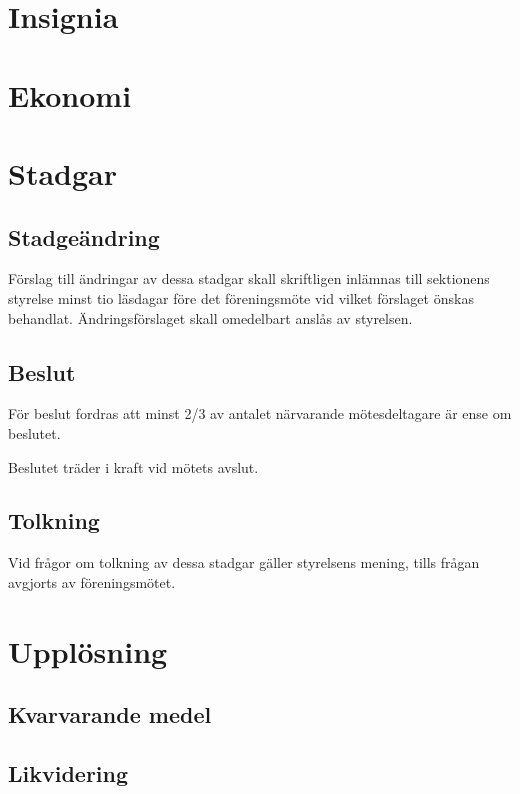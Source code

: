 \documentclass{article}
\begin{document}
\section{Insignia}

\section{Ekonomi}

\section{Stadgar}
\subsection{Stadgeändring}
Förslag till ändringar av dessa stadgar skall skriftligen inlämnas till
sektionens styrelse minst tio läsdagar före det föreningsmöte vid vilket
förslaget önskas behandlat. Ändringsförslaget skall omedelbart anslås av
styrelsen.
\subsection{Beslut}
För beslut fordras att  minst 2/3 av antalet närvarande mötesdeltagare är ense
om beslutet.

Beslutet träder i kraft vid mötets avslut.
\subsection{Tolkning}
Vid frågor om tolkning av dessa stadgar gäller styrelsens mening, tills frågan
avgjorts av föreningsmötet.

\section{Upplösning}
\subsection{Kvarvarande medel}
\subsection{Likvidering}
\end{document}
